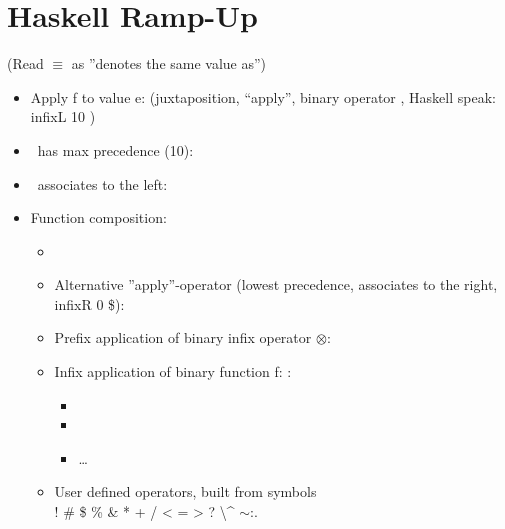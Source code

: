 

\section{Haskell Ramp-Up} %
\label{cha:haskell_ramp_up}

(Read $\equiv$ as ''denotes the same value as'')

\begin{itemize}
    \item Apply f to value e:  (juxtaposition, ``apply'', binary operator \textvisiblespace, Haskell speak: infixL 10 \textvisiblespace)
    \item \textvisiblespace\ has max precedence (10): 
    \item \textvisiblespace\ associates to the left:  
    \item Function composition:
    \begin{itemize}
        \item {}
        \item Alternative ''apply''-operator \codeline{|\$|} (lowest precedence, associates to the right, infixR 0 \$):\\
        \item Prefix application of binary infix operator $\otimes$:  
        \item Infix application of binary function f: :
        \begin{itemize}
            \item {}
            \item {}
            \item \dots
        \end{itemize}
        \item User defined operators, built from symbols \\ ! \# \$ \% \& * + / < = > ? \@ \textbackslash \string^ \textbar $\sim$:.
    \end{itemize}
\end{itemize} 